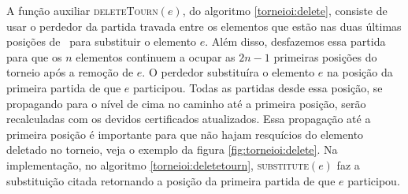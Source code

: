 



A função auxiliar \textsc{deleteTourn}$(e)$, do algoritmo
\ref{torneioi:delete}, consiste de usar o perdedor
da partida travada entre os elementos que estão nas duas últimas
posições de \torneio~para substituir o elemento $e$.
Além disso, desfazemos essa partida para que os
$n$ elementos continuem a ocupar as $2n - 1$ primeiras posições
do torneio após a remoção de $e$. O perdedor
substituíra o elemento $e$ na posição da
primeira partida de que $e$ participou. Todas as partidas desde
essa posição, se propagando para o nível de cima no caminho até a
primeira posição, serão recalculadas com os devidos certificados
atualizados. Essa propagação até a primeira posição é importante
para que não hajam resquícios do elemento deletado no torneio,
veja o exemplo da figura \ref{fig:torneioi:delete}. Na implementação,
no algoritmo \ref{torneioi:deletetourn}, \textsc{substitute}$(e)$ faz a
substituição citada retornando a posição da primeira partida
de que $e$ participou.




